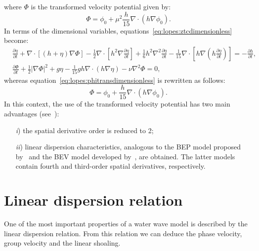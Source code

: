 where $\Phi$ is the transformed velocity potential given by:
\begin{equation}\label{eq:lopes:phitransdimensionless}
\Phi=\phi_0+\mu^2\frac{h}{15}\nabla\cdot(h\nabla\phi_0) .
\end{equation}
In terms of the dimensional
variables, equations~\eqref{eq:lopes:ztcdimensionless} become:
\begin{subequations}\label{eq:lopes:ztc}
\begin{align}
&\frac{\partial\eta}{\partial t}
  +\nabla\cdot[(h+\eta)\nabla{\Phi}] -\frac{1}{2}\nabla\cdot
  [h^{2}\nabla\frac{\partial \eta} {\partial t}]
  +\frac{1}{6}h^{2}\nabla^2\frac{\partial\eta}{\partial t}
  -\frac{1}{15}\nabla\cdot[h\nabla(h\frac{\partial\eta}
    {\partial
      t})]=-\frac{\partial h}{\partial t}, \label{eq:lopes:ztc-a}\\ &\frac{\partial
    \Phi}{\partial t} +\frac{1}{2}|\nabla\Phi|^2+g\eta-
  \frac{1}{15}gh\nabla\cdot(h\nabla\eta)-\nu\nabla^2\Phi=0, \label{eq:lopes:ztc-b}
\end{align}
\end{subequations}
whereas equation~\eqref{eq:lopes:phitransdimensionless} is
rewritten as follows:
\begin{equation}\label{eq:lopes:phitrans}
\Phi=\phi_0+\frac{h}{15}\nabla\cdot(h\nabla\phi_0) .
\end{equation}
 In this context, the use of the transformed velocity
 potential has two main advantages
 (see~\citet{ZhaoTengCheng2004}):
\begin{itemize}
\item[{\it i})] the spatial derivative order is reduced to 2;
\item[{\it ii})] linear dispersion characteristics,
  analogous to the  BEP model proposed
  by~\citet{ChenLiu1994} and the  BEV model
  developed by~\citet{Nwogu1993}, are obtained.
The latter models contain fourth and third-order spatial
derivatives, respectively.
\end{itemize}

\section{Linear dispersion relation}\label{sec:lopes:dispersionproperties}
One of the most important properties of a water wave model
is described by the linear dispersion relation.  From this
relation we can deduce the phase velocity, group velocity
and the linear shoaling.

